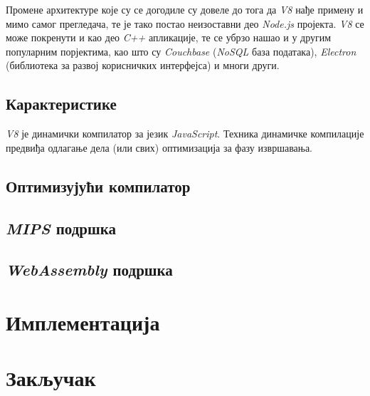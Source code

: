 \documentclass[12pt,oneside]{memoir}
\begin{document}
Промене архитектуре које су се догодиле су довеле до тога да \textit{V8} нађе примену и мимо самог прегледача, те је тако постао неизоставни део \textit{Node.js} пројекта.
\textit{V8} се може покренути и као део \textit{C++} апликације, те се убрзо нашао и у другим популарним порјектима, као што су \textit{Couchbase} (\textit{NoSQL} база података),
\textit{Electron} (библиотека за развој корисничких интерфејса) и многи други.

\section{Карактеристике} \label{chp:CHAR}

\textit{V8} је динамички компилатор за језик \textit{JavaScript}. Техника динамичке компилације предвиђа одлагање дела (или свих) оптимизација за фазу извршавања.

\section{Оптимизујући компилатор} \label{chp:OPT} %

\section{\textit{MIPS} подршка} \label{chp:V8MIPS}

\section{\textit{WebAssembly} подршка} \label{chp:V8WASM}

\chapter{Имплементација}

\chapter{Закључак}

\literatura

\backmatter
\end{document}
